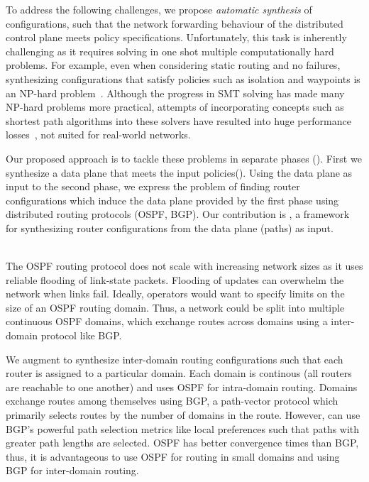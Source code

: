 To address the following challenges, we propose
\emph{automatic synthesis} of configurations, such that 
the network forwarding behaviour of the distributed
control plane meets policy specifications. 
Unfortunately, this task is inherently challenging 
as it requires solving in one shot multiple
computationally hard problems.
For example, even when considering 
static routing and no failures, 
synthesizing configurations 
that satisfy policies 
such as isolation and waypoints
is an NP-hard problem~\cite{genesis}.
Although the progress in SMT solving 
has made many NP-hard problems more practical, 
attempts of incorporating concepts such 
as shortest path algorithms 
into these solvers have resulted 
into huge performance losses~\cite{monosat}, 
not suited for real-world networks.

Our proposed approach is to tackle these problems 
in separate phases
().
First we synthesize a data plane that 
meets the input policies().
Using the data plane as input 
to the second phase, we 
express the problem of 
finding router configurations which 
induce the data plane provided by the
first phase using distributed routing
protocols (OSPF, BGP). Our contribution 
is \name, a framework for synthesizing
router configurations from the data
plane (paths) as input. 

 \\

The OSPF routing protocol does not scale 
with increasing network sizes
as it uses reliable
flooding of link-state packets. Flooding 
of updates can  
overwhelm the network when links fail. 
Ideally, operators would want to specify
limits on the size of an OSPF routing domain. 
Thus, a network could be 
split into multiple continuous OSPF domains,
which exchange routes across domains using
a inter-domain protocol like BGP.

We augment \name to synthesize 
inter-domain routing configurations 
such that each router is assigned to
a particular domain. 
Each domain is continous (all routers
are reachable to one another) and 
uses OSPF for intra-domain routing.
Domains exchange routes among  
themselves using BGP, a path-vector 
protocol which primarily selects routes by 
the number of domains in the route. 
However, \name can 
use BGP's powerful path selection metrics 
like local preferences such that  
paths with greater path lengths are selected.
OSPF has better convergence times than BGP,
thus, it is advantageous to use OSPF for 
routing in small domains and using BGP for
inter-domain routing. 

